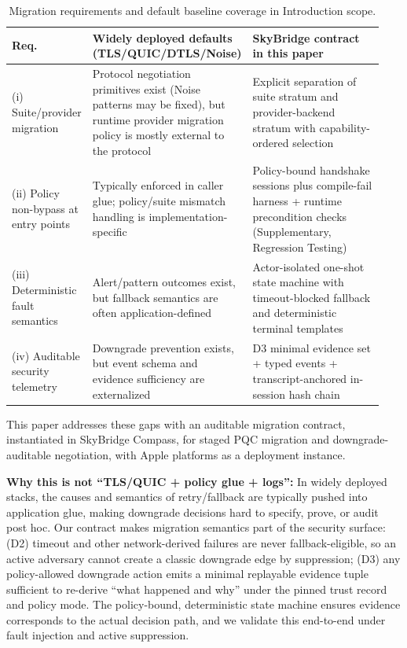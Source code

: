 \documentclass[10pt,journal,compsoc]{IEEEtran}
\begin{document}
\begin{table}[!t]
\centering
\scriptsize
\caption{Migration requirements and default baseline coverage in Introduction scope.}
\label{tab:intro-migration-gap}
\begingroup
\setlength{\tabcolsep}{2pt}
\begin{tabular}{@{}p{0.16\linewidth}p{0.39\linewidth}p{0.39\linewidth}@{}}
\toprule
Req. & Widely deployed defaults (TLS/QUIC/DTLS/Noise) & SkyBridge contract in this paper \\
\midrule
(i) Suite/provider migration & Protocol negotiation primitives exist (Noise patterns may be fixed), but runtime provider migration policy is mostly external to the protocol & Explicit separation of suite stratum and provider-backend stratum with capability-ordered selection \\
(ii) Policy non-bypass at entry points & Typically enforced in caller glue; policy/suite mismatch handling is implementation-specific & Policy-bound handshake sessions plus compile-fail harness + runtime precondition checks (Supplementary, Regression Testing) \\
(iii) Deterministic fault semantics & Alert/pattern outcomes exist, but fallback semantics are often application-defined & Actor-isolated one-shot state machine with timeout-blocked fallback and deterministic terminal templates \\
(iv) Auditable security telemetry & Downgrade prevention exists, but event schema and evidence sufficiency are externalized & D3 minimal evidence set + typed events + transcript-anchored in-session hash chain \\
\bottomrule
\end{tabular}
\endgroup
\end{table}

This paper addresses these gaps with an auditable migration contract,
instantiated in SkyBridge Compass, for staged PQC migration and
downgrade-auditable negotiation, with Apple platforms as a deployment
instance.

\textbf{Why this is not ``TLS/QUIC + policy glue + logs'':} In widely
deployed stacks, the causes and semantics of retry/fallback are
typically pushed into application glue, making downgrade decisions hard
to specify, prove, or audit post hoc. Our contract makes migration
semantics part of the security surface: (D2) timeout and other
network-derived failures are never fallback-eligible, so an active
adversary cannot create a classic downgrade edge by suppression; (D3)
any policy-allowed downgrade action emits a minimal replayable evidence
tuple sufficient to re-derive ``what happened and why'' under the pinned
trust record and policy mode. The policy-bound, deterministic state
machine ensures evidence corresponds to the actual decision path, and we
validate this end-to-end under fault injection and active suppression.
\end{document}
